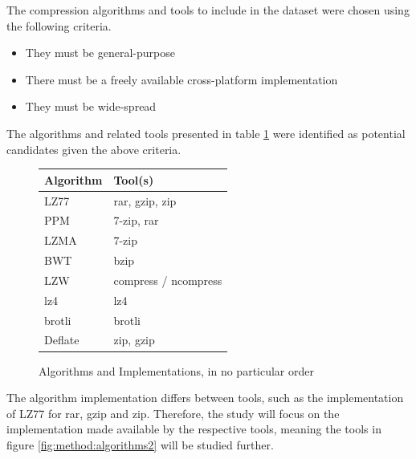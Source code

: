 \documentclass[conference]{IEEEtran}
\begin{document}
The compression algorithms and tools to include in the dataset were chosen using the following criteria.

\begin{itemize}
    \item They must be general-purpose
    \item There must be a freely available cross-platform implementation
    \item They must be wide-spread
\end{itemize}

The algorithms and related tools presented in table \ref{fig:method:algorithms} were identified as potential candidates given the above criteria.

\begin{figure}[H]
    \centering
    \begin{tabular}{l|l}
        Algorithm & Tool(s)\\
        \hline
        LZ77 & rar, gzip, zip\cite{HORNEY2013,KONECKI2011} \\
        PPM & 7-zip, rar\cite{HORNEY2013, KONECKI2011} \\
        LZMA & 7-zip\cite{HORNEY2013, KONECKI2011} \\
        BWT & bzip\cite{HORNEY2013, KONECKI2011} \\
        LZW & compress / ncompress\cite{HORNEY2013, KONECKI2011} \\
        lz4 & lz4\footnotemark\\
        brotli & brotli\footnotemark \\
        Deflate & zip, gzip\cite{HORNEY2013} \\
    \end{tabular}
    \caption{Algorithms and Implementations, in no particular order}
    \label{fig:method:algorithms}
\end{figure}
\addtocounter{footnote}{-2}
\addtocounter{footnote}{1}
\addtocounter{footnote}{1}

The algorithm implementation differs between tools, such as the implementation of LZ77 for rar, gzip and zip\cite{HORNEY2013}. Therefore, the study will focus on the implementation made available by the respective tools, meaning the tools in figure \ref{fig:method:algorithms2} will be studied 
further.
\end{document}
